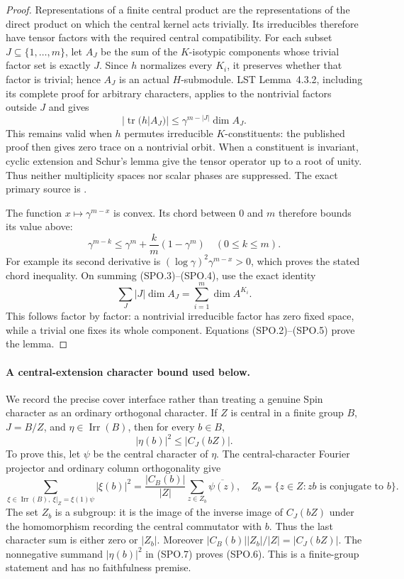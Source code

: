 \begin{proof}
Representations of a finite central product are the representations
of the direct product on which the central kernel acts trivially.
Its irreducibles therefore have tensor factors with the required
central compatibility.  For each subset $J\subseteq\{1,\ldots,m\}$,
let $A_J$ be the sum of the $K$-isotypic components whose trivial
factor set is exactly $J$.  Since $h$ normalizes every $K_i$,
it preserves whether that factor is trivial; hence $A_J$ is
an actual $H$-submodule.
LST Lemma~4.3.2, including its complete proof for arbitrary characters,
applies to the nontrivial factors outside $J$ and gives
\[
 |\operatorname{tr}(h|A_J)|
               \le\gamma^{m-|J|}\dim A_J.
 \tag{SPO.3}
\]
This remains valid when $h$ permutes irreducible $K$-constituents:
the published proof then gives zero trace on a nontrivial orbit.
When a constituent is invariant, cyclic extension and Schur's lemma
give the tensor operator up to a root of unity.  Thus neither
multiplicity spaces nor scalar phases are suppressed.
The exact primary source is
\cite[Lemma~4.3.2 and its full proof, pp.~1912--1913]{HOS:LST2011}.

The function $x\mapsto\gamma^{m-x}$ is convex.  Its chord between
$0$ and $m$ therefore bounds its value above:
\[
 \gamma^{m-k}\le\gamma^m+\frac{k}{m}(1-\gamma^m)
       \quad(0\le k\le m).
 \tag{SPO.4}
\]
For example its second derivative is
$(\log\gamma)^2\gamma^{m-x}>0$, which proves the stated chord
inequality.  On summing (SPO.3)--(SPO.4), use the exact identity
\[
 \sum_J |J|\dim A_J=\sum_{i=1}^m\dim A^{K_i}.
 \tag{SPO.5}
\]
This follows factor by factor: a nontrivial irreducible factor has
zero fixed space, while a trivial one fixes its whole component.
Equations (SPO.2)--(SPO.5) prove the lemma.
\end{proof}

\paragraph{A central-extension character bound used below.}
We record the precise cover interface rather than treating a genuine
Spin character as an ordinary orthogonal character.  If $Z$ is central
in a finite group $B$, $J=B/Z$, and $\eta\in\operatorname{Irr}(B)$,
then for every $b\in B$,
\[
                   |\eta(b)|^2\le |C_J(bZ)|.
 \tag{SPO.6}
\]
To prove this, let $\psi$ be the central character of $\eta$.
The central-character Fourier projector and ordinary column
orthogonality give
\[
 \sum_{\xi\in\operatorname{Irr}(B),\ \xi|_Z=\xi(1)\psi}
                 |\xi(b)|^2
  =\frac{|C_B(b)|}{|Z|}
        \sum_{z\in Z_b}\overline{\psi(z)},
 \quad Z_b=\{z\in Z:zb\text{ is conjugate to }b\}.
 \tag{SPO.7}
\]
The set $Z_b$ is a subgroup: it is the image of the inverse
image of $C_J(bZ)$ under the homomorphism recording the central
commutator with $b$.  Thus the last character sum is either
zero or $|Z_b|$.  Moreover
$|C_B(b)||Z_b|/|Z|=|C_J(bZ)|$.  The nonnegative summand
$|\eta(b)|^2$ in (SPO.7) proves (SPO.6).
This is a finite-group statement and has no faithfulness premise.

